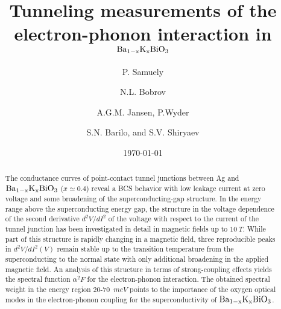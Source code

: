 \documentclass[twocolumn,amsmath,floats,showpacs,nofootinbib]{revtex4}
\begin{document}
\title{Tunneling measurements of the electron-phonon interaction in $\rm Ba_{1-x}K_xBiO_3$}

\author{P. Samuely}
\author{N.L. Bobrov}
\author{A.G.M. Jansen, P.Wyder}
\author{S.N. Barilo, and S.V. Shiryaev}

\date{\today}

\begin{abstract}The conductance curves of point-contact tunnel junctions between Ag and $\rm Ba_{1-x}K_xBiO_3$ ($x\simeq 0.4$) reveal a BCS behavior with low leakage current at zero voltage and some broadening of the superconducting-gap structure. In the energy range above the superconducting energy gap, the structure in the voltage dependence of the second derivative $d^2V/dI^2$ of the voltage with respect to the current of the tunnel junction has been investigated in detail in magnetic fields up to $10\ T$. While part of this structure is rapidly changing in a magnetic field, three reproducible peaks in $d^2V/dI^2(V)$ remain stable up to the transition temperature from the superconducting to the normal state with only additional broadening in the applied magnetic field. An analysis of this structure in terms of strong-coupling effects yields the spectral function $\alpha^2F$ for the electron-phonon interaction. The obtained spectral weight in the energy region 20-70~$meV$ points to the importance of the oxygen optical modes in the electron-phonon coupling for the superconductivity of $\rm Ba_{1-x}K_xBiO_3$.

\end{abstract}
\end{document}
